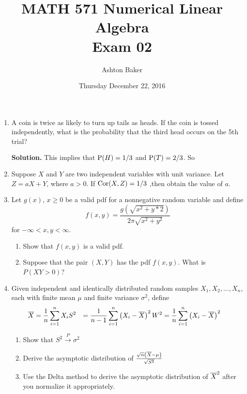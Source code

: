 \documentclass[titlepage]{article}
\begin{document}
\title{MATH 571 Numerical Linear Algebra\\Exam 02}
\author{Ashton Baker}
\date{Thursday December 22, 2016}
\maketitle
\begin{enumerate}
\item A coin is twice as likely to turn up tails as heads. If the coin is tossed independently, what is the probability that the third head occurs on the 5th trial?

\textbf{Solution.} This implies that $\P(H) = 1/3$ and $\P(T) = 2/3$. So

\item Suppose $X$ and $Y$ are two independent variables with unit variance. Let $Z = aX + Y$, where $a > 0$. If $\cor(X, Z) = 1/3$ ,then obtain the value of $a$.

\item Let $g(x)$, $x \geq 0$ be a valid pdf for a nonnegative random variable and define
\[ f(x, y) = \frac{ g(\sqrt{x^2 + y*2}) }{ 2\pi \sqrt{x^2 + y^2} }\]
for $-\infty < x, y < \infty$.
  \begin{enumerate}
  \item Show that $f(x, y)$ is a valid pdf.

  \item Suppose that the pair $(X, Y)$ has the pdf $f(x, y)$. What is $P(XY > 0)$?
  \end{enumerate}

\item Given independent and identically distributed random samples $X_1, X_2, \ldots, X_n$, each with finite mean $\mu$ and finite variance $\sigma^2$, define
\[\begin{aligned}
\Xbar &= \frac{1}{n} \sum_{i = 1}^n X_i
S^2 &= \frac{1}{n-1} \sum_{i = 1}^n \left(X_i - \Xbar\right)^2
W^2 &= \frac{1}{n} \sum_{i = 1}^n \left(X_i - \Xbar\right)^2
\end{aligned}\]
  \begin{enumerate}
  \item Show that $S^2 \xrightarrow{P} \sigma^2$
  \item Derive the asymptotic distribution of $\frac{\sqrt{n}\left(\Xbar - \mu\right)}{\sqrt{S^2}}$
  \item Use the Delta method to derive the asymptotic distribution of $\Xbar^2$ after you normalize it appropriately.
  \end{enumerate}


\end{enumerate}
\end{document}
